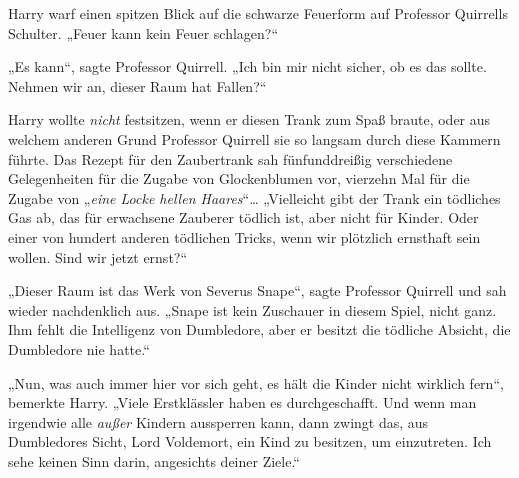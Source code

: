Harry warf einen spitzen Blick auf die schwarze Feuerform auf Professor Quirrells Schulter.
„Feuer kann kein Feuer schlagen?“

„Es kann“, sagte Professor Quirrell.
„Ich bin mir nicht sicher, ob es das sollte. Nehmen wir an, dieser Raum hat Fallen?“

Harry wollte \emph{nicht} festsitzen, wenn er diesen Trank zum Spaß braute, oder aus welchem anderen Grund Professor Quirrell sie so langsam durch diese Kammern führte. Das Rezept für den Zaubertrank sah fünfunddreißig verschiedene Gelegenheiten für die Zugabe von Glockenblumen vor, vierzehn Mal für die Zugabe von „\emph{eine Locke hellen Haares}“…
„Vielleicht gibt der Trank ein tödliches Gas ab, das für erwachsene Zauberer tödlich ist, aber nicht für Kinder. Oder einer von hundert anderen tödlichen Tricks, wenn wir plötzlich ernsthaft sein wollen. Sind wir jetzt ernst?“

„Dieser Raum ist das Werk von Severus Snape“, sagte Professor Quirrell und sah wieder nachdenklich aus.
„Snape ist kein Zuschauer in diesem Spiel, nicht ganz. Ihm fehlt die Intelligenz von Dumbledore, aber er besitzt die tödliche Absicht, die Dumbledore nie hatte.“

„Nun, was auch immer hier vor sich geht, es hält die Kinder nicht wirklich fern“, bemerkte Harry.
„Viele Erstklässler haben es durchgeschafft. Und wenn man irgendwie alle \emph{außer} Kindern aussperren kann, dann zwingt das, aus Dumbledores Sicht, Lord Voldemort, ein Kind zu besitzen, um einzutreten. Ich sehe keinen Sinn darin, angesichts deiner Ziele.“

